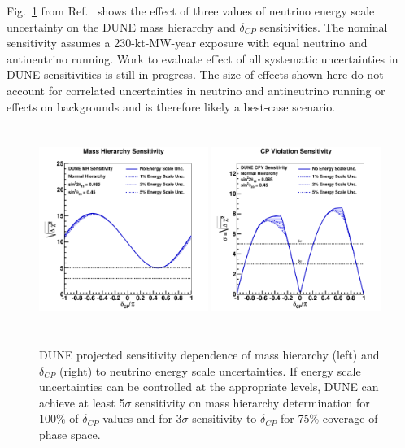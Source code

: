  Fig.~\ref{fig:global_escale_sens} from Ref.~\cite{dunecdr} shows the effect of 
three values of neutrino energy scale uncertainty on the DUNE 
mass hierarchy and $\delta_{CP}$ sensitivities.
The nominal sensitivity assumes a 230-kt-MW-year 
exposure with equal neutrino and antineutrino running. 
Work to evaluate effect of all systematic uncertainties in DUNE sensitivities is still in progress. 
The size of effects shown here do not account for correlated uncertainties in neutrino and 
antineutrino running or effects on backgrounds and is therefore likely
a best-case scenario. 
\begin{figure}[h!]
\centering
\includegraphics[width=0.49\textwidth,height=6.7cm]{figures/mh_230ktmwyear_varyesyst}
\includegraphics[width=0.49\textwidth,height=6.7cm]{figures/cpv_890ktmwyear_varyesyst}
\label{fig:global_escale_sens}
  \caption{DUNE projected sensitivity dependence of mass hierarchy (left) and $\delta_{CP}$ 
(right) to neutrino energy scale uncertainties. 
If energy scale uncertainties can be controlled at the appropriate levels, DUNE can achieve 
at least 5$\sigma$ sensitivity on mass hierarchy determination for 100\% of $\delta_{CP}$ values and
for 3$\sigma$ sensitivity to  $\delta_{CP}$ for 75\% coverage of phase space.
}
\end{figure}


